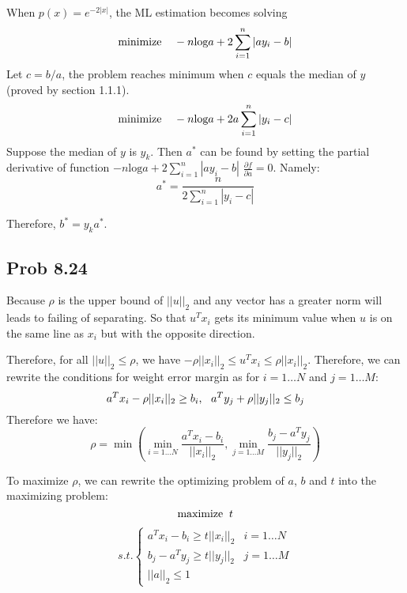 \documentclass[10pt,a4paper]{article}
\begin{document}
When $p(x)=e^{-2|x|}$, the ML estimation becomes solving
$$ \text{minimize\;\;\;\;}-n\text{log}a+2\sum_{i=1}^{n}|ay_i-b|$$
Let $c=b/a$, the problem reaches minimum when $c$ equals the
median of $y$ (proved by section 1.1.1). 
$$ \text{minimize\;\;\;\;}-n\text{log}a+2a\sum_{i=1}^{n}|y_i-c|$$
Suppose the median of $y$ is $y_k$. Then $a^*$ can be found
by setting the partial derivative of function
$-n\text{log}a+2\sum_{i=1}^{n}|ay_i-b|$ $\frac{\partial
  f}{\partial a}=0$. Namely: 
$$a^* = \frac{n}{2\sum_{i=1}^{n}|y_i-c|}$$

Therefore, $b^*=y_ka^*$.


\subsection{Prob 8.24}
Because $\rho$ is the upper bound of $||u||_2$ and any
vector has a greater norm will leads to failing of
separating. So that $u^Tx_i$ gets its minimum value when $u$
is on the same line as $x_i$ but with the opposite
direction.

Therefore, for all $||u||_2\leq \rho$, we have $-\rho ||x_i||_2 \leq
u^Tx_i\leq \rho ||x_i||_2$. Therefore, we can rewrite the
conditions for weight error margin as for $i=1\dots N$ and
$j=1\dots M$:
$$
a^Tx_i-\rho||x_i||_2\geq b_i \text{,\;\;\;}
a^Ty_j+\rho||y_j||_2\leq b_j
$$
Therefore we have:
$$\rho = \min(\min_{i=1\dots
  N}{\frac{a^Tx_i-b_i}{||x_i||_2}},\min_{j=1\dots M}{\frac{b_j-a^Ty_j}{||y_j||_2}})$$

To maximize $\rho$, we can rewrite the optimizing problem of $a$, $b$ and $t$ into the maximizing
problem:
$$\text{maximize\;\;}t$$
\begin{align*}
  s.t.
  \begin{cases}
    a^Tx_i-b_i\geq t||x_i||_2 & i=1\dots N\\
    b_j-a^Ty_j\geq t||y_j||_2 & j=1\dots M\\
    ||a||_2\leq 1
\end{cases}
\end{align*}




	\renewcommand\refname{Bibliography}
	
	
\end{document}
